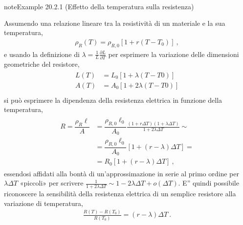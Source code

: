 \documentclass[letterpaper,10pt,italian]{jupyterBook}
\begin{document}
\begin{sphinxadmonition}{note}{Example 20.2.1 (Effetto della temperatura sulla resistenza)}



\sphinxAtStartPar
Assumendo una relazione lineare tra la resistività di un materiale e la sua temperatura,
\begin{equation*}
\begin{split}\rho_R(T) = \rho_{R,0} \left[ 1 + r (T - T_0) \right] \ ,\end{split}
\end{equation*}
\sphinxAtStartPar
e usando la definizione di {\hyperref[\detokenize{ch/thermodynamics/elastic-solid-1d:physics-hs-thermodynamics-matter-elastic-1d-dilation}]{}} \(\lambda = \frac{1}{L}\frac{\partial L}{\partial T}\) per esprimere la variazione delle dimensioni geometriche del resistore,
\begin{equation*}
\begin{split}\begin{aligned}
  L(T) & = L_0 \left[ 1 + \lambda   (T-T0) \right] \\
  A(T) & = A_0 \left[ 1 + 2 \lambda (T-T0) \right] \\
\end{aligned}\end{split}
\end{equation*}
\sphinxAtStartPar
si può esprimere la dipendenza della resistenza elettrica in funzione della temperatura,
\begin{equation*}
\begin{split}\begin{aligned}
 R = \dfrac{\rho_R \ell}{A} 
 & = \dfrac{\rho_{R,0} \ell_0}{A_0} \frac{\left( 1 + r \Delta T\right)\left( 1 + \lambda \Delta T \right)}{1 + 2 \lambda \Delta T} \sim \\
 & = \dfrac{\rho_{R,0} \ell_0}{A_0} \left[ 1 + \left( r - \lambda \right) \Delta T \right] = \\
 & = R_0 \left[ 1 + \left( r - \lambda \right) \Delta T \right] \ ,
\end{aligned}\end{split}
\end{equation*}
\sphinxAtStartPar
essendosi affidati alla bontà di un’approssimazione in serie al primo ordine per \(\lambda \Delta T\) «piccoli» per scrivere \(\frac{1}{1 + 2 \lambda \Delta T} \sim 1 - 2 \lambda \Delta T + o(\Delta T)\). E” quindi possibile riconoscere la sensibilità della resistenza elettrica di un semplice resistore alla variazione di temperatura,
\begin{equation*}
\begin{split}\frac{R(T)- R(T_0)}{R(T_0)} = (r - \lambda) \Delta T \ .\end{split}
\end{equation*}\end{sphinxadmonition}
\end{document}

